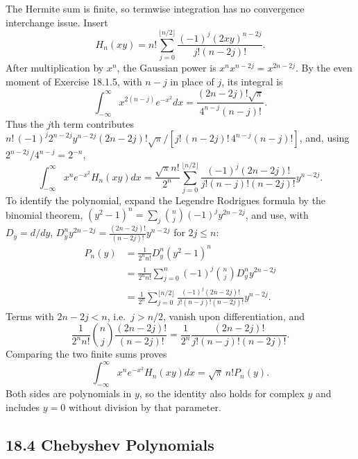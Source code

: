 The Hermite sum is finite, so termwise integration has no convergence
interchange issue.  Insert
\[
H_n(xy)=n!\sum_{j=0}^{\lfloor n/2\rfloor}
 \frac{(-1)^j(2xy)^{n-2j}}{j!(n-2j)!}.
\]
After multiplication by $x^n$, the Gaussian power is
$x^nx^{n-2j}=x^{2n-2j}$.  By the even moment of Exercise 18.1.5,
with $n-j$ in place of $j$, its integral is
\[
\int_{-\infty}^{\infty}x^{2(n-j)}e^{-x^2}dx
 =\frac{(2n-2j)!\sqrt\pi}{4^{n-j}(n-j)!}.
\]
Thus the $j$th term contributes
$n!\,(-1)^j2^{n-2j}y^{n-2j}(2n-2j)!\sqrt\pi
/[j!\,(n-2j)!\,4^{n-j}(n-j)!]$, and, using $2^{n-2j}/4^{n-j}=2^{-n}$,
\[
\int_{-\infty}^{\infty}x^ne^{-x^2}H_n(xy)dx
 =\frac{\sqrt\pi n!}{2^n}
 \sum_{j=0}^{\lfloor n/2\rfloor}
 \frac{(-1)^j(2n-2j)!}{j!(n-j)!(n-2j)!}y^{n-2j}.
\]
To identify the polynomial, expand the Legendre Rodrigues formula by
the binomial theorem, $(y^2-1)^n=\sum_j\binom nj(-1)^jy^{2n-2j}$, and use,
with $D_y=d/dy$, $D_y^ny^{2n-2j}=\frac{(2n-2j)!}{(n-2j)!}y^{n-2j}$ for
$2j\le n$:
\begin{align*}
P_n(y)
 &=\frac1{2^nn!}D_y^n(y^2-1)^n\\
 &=\frac1{2^nn!}\sum_{j=0}^n(-1)^j\binom nj D_y^ny^{2n-2j}\\
 &=\frac1{2^n}\sum_{j=0}^{\lfloor n/2\rfloor}
 \frac{(-1)^j(2n-2j)!}{j!(n-j)!(n-2j)!}y^{n-2j}.
\end{align*}
Terms with $2n-2j<n$, i.e.\ $j>n/2$, vanish upon differentiation, and
\[
\frac1{2^nn!}\binom nj\frac{(2n-2j)!}{(n-2j)!}
=\frac1{2^n}\frac{(2n-2j)!}{j!(n-j)!(n-2j)!}.
\]
Comparing the two finite sums proves
\[
\boxed{\int_{-\infty}^{\infty}x^ne^{-x^2}H_n(xy)dx
       =\sqrt\pi\,n!P_n(y)}.
\]
Both sides are polynomials in $y$, so the identity also holds for
complex $y$ and includes $y=0$ without division by that parameter.

\subsection*{18.4 Chebyshev Polynomials}

